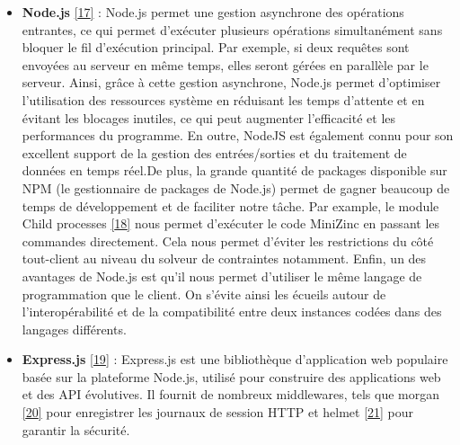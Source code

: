 \documentclass[12pt]{article}
\begin{document}
      \begin{itemize}
            \item
                  \textbf{Node.js} \protect\hyperlink{ref-Node_js}{{[}17{]}} : Node.js
                  permet une gestion asynchrone des opérations entrantes, ce qui permet
                  d'exécuter plusieurs opérations simultanément sans bloquer le fil
                  d'exécution principal. Par exemple, si deux requêtes sont envoyées au
                  serveur en même temps, elles seront gérées en parallèle par le
                  serveur. Ainsi, grâce à cette gestion asynchrone, Node.js permet
                  d'optimiser l'utilisation des ressources système en réduisant les
                  temps d'attente et en évitant les blocages inutiles, ce qui peut
                  augmenter l'efficacité et les performances du programme. En outre,
                  NodeJS est également connu pour son excellent support de la gestion
                  des entrées/sorties et du traitement de données en temps
                  réel.\newline  De plus, la grande quantité de packages disponible sur
                  NPM (le gestionnaire de packages de Node.js) permet de gagner beaucoup
                  de temps de développement et de faciliter notre tâche. Par example, le
                  module Child processes
                  \protect\hyperlink{ref-Child_Processes}{{[}18{]}} nous permet
                  d'exécuter le code MiniZinc en passant les commandes directement. Cela
                  nous permet d'éviter les restrictions du côté tout-client au niveau du
                  solveur de contraintes notamment. Enfin, un des avantages de Node.js
                  est qu'il nous permet d'utiliser le même langage de programmation que
                  le client. On s'évite ainsi les écueils autour de l'interopérabilité
                  et de la compatibilité entre deux instances codées dans des langages
                  différents.
            \item
                  \textbf{Express.js} \protect\hyperlink{ref-Express_js}{{[}19{]}} :
                  Express.js est une bibliothèque d'application web populaire basée sur
                  la plateforme Node.js, utilisé pour construire des applications web et
                  des API évolutives. Il fournit de nombreux middlewares, tels que
                  morgan \protect\hyperlink{ref-morgan}{{[}20{]}} pour enregistrer les
                  journaux de session HTTP et helmet
                  \protect\hyperlink{ref-helmet}{{[}21{]}} pour garantir la sécurité.

\end{itemize}
\end{document}
